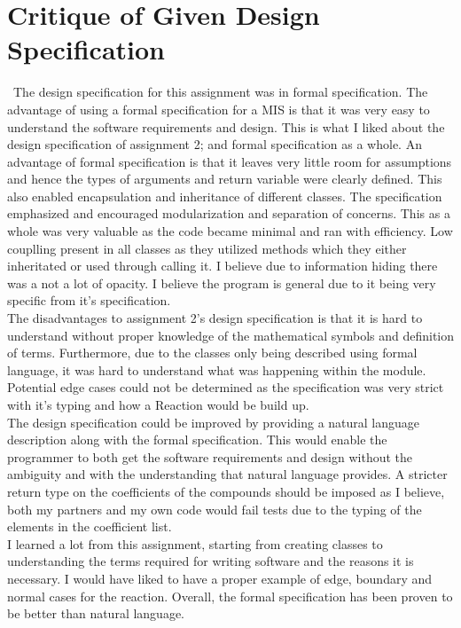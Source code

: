 \documentclass[12pt]{article}
\begin{document}
\section{Critique of Given Design Specification}

~\newline\indent The design specification for this assignment was in formal specification. The advantage of using a formal specification for a MIS is that it was very easy to understand the software requirements and design. This is what I liked about the design specification of assignment 2; and formal specification as a whole. An advantage of formal specification is that it leaves very little room for assumptions and hence the types of arguments and return variable were clearly defined. This also enabled encapsulation and inheritance of different classes. The specification emphasized and encouraged modularization and separation of concerns. This as a whole was very valuable as the code became minimal and ran with efficiency. Low couplling present in all classes as they utilized methods which they either inheritated or used through calling it. I believe due to information hiding there was a not a lot of opacity. I believe the program is general due to it being very specific from it's specification.\\

The disadvantages to assignment 2's design specification is that it is hard to understand without proper knowledge of the mathematical symbols and definition of terms. Furthermore, due to the classes only being described using formal language, it was hard to understand what was happening within the module. Potential edge cases could not be determined as the specification was very strict with it’s typing and how a Reaction would be build up.\\

The design specification could be improved by providing a natural language description along with the formal specification. This would enable the programmer to both get the software requirements and design without the ambiguity and with the understanding that natural language provides. A stricter return type on the coefficients of the compounds should be imposed as I believe, both my partners and my own code would fail tests due to the typing of the elements in the coefficient list. \\

I learned a lot from this assignment, starting from creating classes to understanding the terms required for writing software and the reasons it is necessary. I would have liked to have a proper example of edge, boundary and normal cases for the reaction. Overall, the formal specification has been proven to be better than natural language.\\
\end{document}
